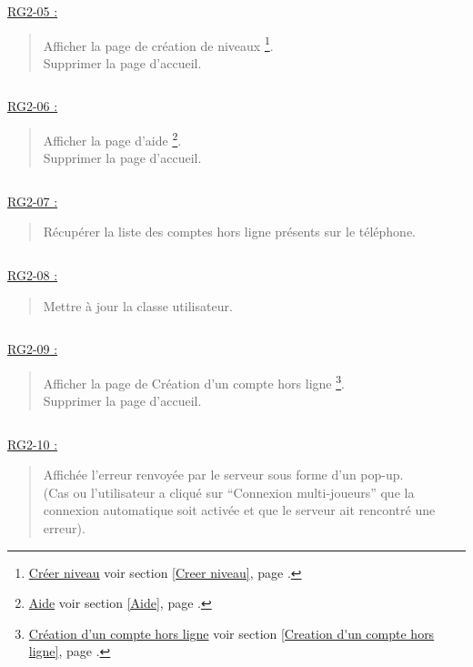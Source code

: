 \documentclass{report}
\begin{document}
		$\,$

		\underline{RG2-05 :}
			\begin{quote}
				Afficher la page de création de niveaux%
					\footnote{
						\hyperlink{Creer niveau}{Créer niveau}
						\og voir section \ref{Creer niveau}, page \pageref{Creer niveau}.\fg
					}.\\
				Supprimer la page d'accueil\footnotemark[2].		
			\end{quote}

		$\,$

		\underline{RG2-06 :}
			\begin{quote}
				Afficher la page d'aide%
					\footnote{
						\hyperlink{Aide}{Aide}
						\og voir section \ref{Aide}, page \pageref{Aide}.\fg
					}.\\
				Supprimer la page d'accueil\footnotemark[2].		
			\end{quote}
		
		$\,$	
			
		\underline{RG2-07 :}
			\begin{quote}
				Récupérer la liste des comptes hors ligne présents sur le téléphone.
			\end{quote}

		$\,$

		\underline{RG2-08 :}
			\begin{quote}
				Mettre à jour la classe utilisateur.
			\end{quote}

		$\,$

		\underline{RG2-09 :}
			\begin{quote}
				Afficher la page de Création d'un compte hors ligne%
					\footnote{
						\hyperlink{profil}{Création d'un compte hors ligne}
						\og voir section \ref{Creation d'un compte hors ligne}, page \pageref{Creation d'un compte hors ligne}.\fg
					}.\\
				Supprimer la page d'accueil\footnotemark[2].
			\end{quote}

		$\,$
				
		\underline{RG2-10 :}
			\begin{quote}
				Affichée l'erreur renvoyée par le serveur sous forme d'un pop-up.\\
				(Cas ou l'utilisateur a cliqué sur ``Connexion multi-joueurs'' que la connexion automatique soit activée et que le serveur ait rencontré une erreur).
			\end{quote}
	
\newpage
\end{document}
